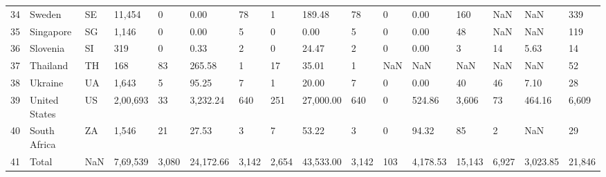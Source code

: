 \begin{tabular}{llllllllllllllll}
34 &              Sweden &        SE  &               11,454 &               0 &                     0.00 &                        78 &               1 &                   189.48 &                        78 &               0 &                     0.00 &                       160 &                 NaN &                      NaN &                       339 \\
35 &           Singapore &        SG  &                1,146 &               0 &                     0.00 &                         5 &               0 &                     0.00 &                         5 &               0 &                     0.00 &                        48 &                 NaN &                      NaN &                       119 \\
36 &            Slovenia &        SI  &                  319 &               0 &                     0.33 &                         2 &               0 &                    24.47 &                         2 &               0 &                     0.00 &                         3 &                  14 &                     5.63 &                        14 \\
37 &            Thailand &        TH  &                  168 &              83 &                   265.58 &                         1 &              17 &                    35.01 &                         1 &             NaN &                      NaN &                       NaN &                 NaN &                      NaN &                        52 \\
38 &             Ukraine &    UA      &                1,643 &               5 &                    95.25 &                         7 &               1 &                    20.00 &                         7 &               0 &                     0.00 &                        40 &                  46 &                     7.10 &                        28 \\
39 &       United States &        US  &             2,00,693 &              33 &                 3,232.24 &                       640 &             251 &                27,000.00 &                       640 &               0 &                   524.86 &                     3,606 &                  73 &                   464.16 &                     6,609 \\
40 &        South Africa &        ZA  &                1,546 &              21 &                    27.53 &                         3 &               7 &                    53.22 &                         3 &               0 &                    94.32 &                        85 &                   2 &                      NaN &                        29 \\
41 &               Total &        NaN &             7,69,539 &           3,080 &                24,172.66 &                     3,142 &           2,654 &                43,533.00 &                     3,142 &             103 &                 4,178.53 &                    15,143 &               6,927 &                 3,023.85 &                    21,846 \\
\bottomrule
\end{tabular}
